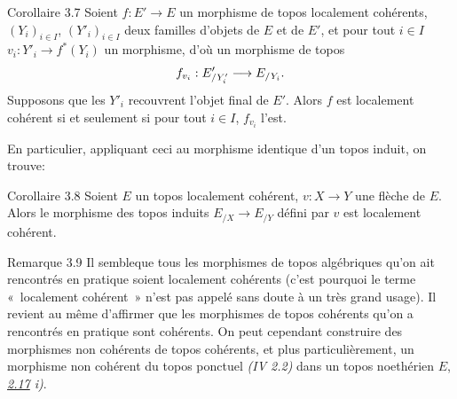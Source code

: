 \documentclass[10pt]{../fichiers-configuration-latex/smfart}
\begin{document}
\begin{enonce*}{Corollaire 3.7}
Soient $f : E'\to E$ un morphisme de topos localement cohérents,
$(Y_i)_{i \in I}$, $({Y'}_i)_{i \in I}$ deux familles d'objets de
$E$ et de $E'$, et pour tout $i \in I$ $v_i : Y'_i \to
f^{\ast}(Y_i)$ un morphisme, d'où un morphisme de topos
$$
f_{v_i} : E'_{/ Y'_i} \to E_{/Y_i}{\quoi}.
$$
Supposons que les ${Y'}_i$ recouvrent l'objet final de $E'$. Alors $f$
est localement cohérent si et seulement si pour tout $i \in I$,
$f_{v_i}$ l'est.
\end{enonce*}

En particulier, appliquant ceci au morphisme identique d'un topos
induit, on trouve:

\begin{enonce*}{Corollaire 3.8}
Soient $E$ un topos localement cohérent, $v : X \to Y$ une flèche de
$E$. Alors le morphisme des topos induits $E_{/X} \to E_{/Y}$ défini
par $v$ est localement cohérent.
\end{enonce*}

\begin{enonce*}{Remarque 3.9}
Il semble\pageoriginale que tous les morphismes de topos algébriques
qu'on ait rencontrés en pratique soient localement cohérents (c'est
pourquoi le terme « localement cohérent » n'est pas appelé sans
doute à un très grand usage). Il revient au même d'affirmer que les
morphismes de topos cohérents qu'on a rencontrés en pratique sont
cohérents. On peut cependant construire des morphismes non cohérents
de topos cohérents, et plus particulièrement, un morphisme non
cohérent du topos ponctuel \emph{(IV 2.2)} dans un topos noethérien
$E$, \emph{\cf \hyperref[VI.exer2.17]{2.17} i)}.
\end{enonce*}
\end{document}
